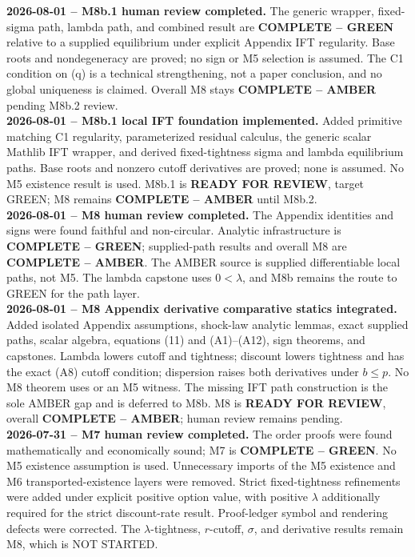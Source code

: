 \documentclass[10pt]{article}
\newcommand{\code}[1]{\texttt{\detokenize{#1}}}
\begin{document}
\textbf{2026-08-01 -- M8b.1 human review completed.}
The generic wrapper, fixed-sigma path, lambda path, and combined result are
\textbf{COMPLETE -- GREEN} relative to a supplied equilibrium under explicit
Appendix IFT regularity. Base roots and nondegeneracy are proved; no sign or M5
selection is assumed. The C1 condition on (q) is a technical strengthening,
not a paper conclusion, and no global uniqueness is claimed. Overall M8 stays
\textbf{COMPLETE -- AMBER} pending M8b.2 review.\\[0.45em]

\textbf{2026-08-01 -- M8b.1 local IFT foundation implemented.}
Added primitive matching C1 regularity, parameterized residual calculus, the
generic scalar Mathlib IFT wrapper, and derived fixed-tightness sigma and
lambda equilibrium paths. Base roots and nonzero cutoff derivatives are
proved; none is assumed. No M5 existence result is used. M8b.1 is
\textbf{READY FOR REVIEW}, target GREEN; M8 remains
\textbf{COMPLETE -- AMBER} until M8b.2.\\[0.6em]

\textbf{2026-08-01 -- M8 human review completed.}
The Appendix identities and signs were found faithful and non-circular.
Analytic infrastructure is \textbf{COMPLETE -- GREEN}; supplied-path results
and overall M8 are \textbf{COMPLETE -- AMBER}. The AMBER source is supplied
differentiable local paths, not M5. The lambda capstone uses \(0<\lambda\), and
M8b remains the route to GREEN for the path layer.\\[0.6em]

\textbf{2026-08-01 -- M8 Appendix derivative comparative statics integrated.}
Added isolated Appendix assumptions, shock-law analytic lemmas, exact supplied
paths, scalar algebra, equations (11) and (A1)--(A12), sign theorems, and
capstones. Lambda lowers cutoff and tightness; discount lowers tightness and
has the exact (A8) cutoff condition; dispersion raises both derivatives under
\(b\leq p\). No M8 theorem uses \code{StaticExistenceAssumptions} or an M5
witness. The missing IFT path construction is the sole AMBER gap and is
deferred to M8b. M8 is \textbf{READY FOR REVIEW}, overall
\textbf{COMPLETE -- AMBER}; human review remains pending.\\[0.6em]

\textbf{2026-07-31 -- M7 human review completed.}
The order proofs were found mathematically and economically sound; M7 is
\textbf{COMPLETE -- GREEN}. No M5 existence assumption is used. Unnecessary
imports of the M5 existence and M6 transported-existence layers were removed.
Strict fixed-tightness refinements were added under explicit positive option
value, with positive \(\lambda\) additionally required for the strict
discount-rate result. Proof-ledger symbol and rendering defects were corrected.
The \(\lambda\)-tightness, \(r\)-cutoff, \(\sigma\), and derivative results
remain M8, which is NOT STARTED.\\[0.6em]
\end{document}
